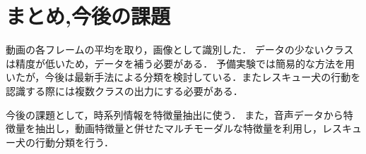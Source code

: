 \section{まとめ,今後の課題}
動画の各フレームの平均を取り，画像として識別した．
データの少ないクラスは精度が低いため，データを補う必要がある．
予備実験では簡易的な方法を用いたが，今後は最新手法による分類を検討している．またレスキュー犬の行動を認識する際には複数クラスの出力にする必要がある．


今後の課題として，時系列情報を特徴量抽出に使う．
また，音声データから特徴量を抽出し，動画特徴量と併せたマルチモーダルな特徴量を利用し，レスキュー犬の行動分類を行う．


{\scriptsize %
%


}
% 
% 

